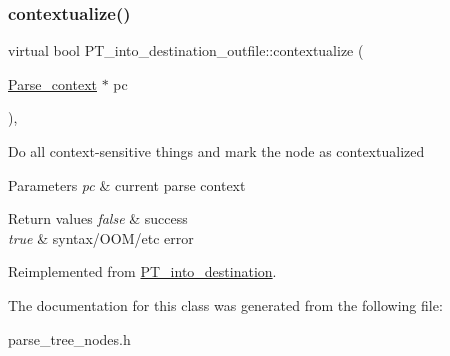 \subsubsection{\texorpdfstring{contextualize()}{contextualize()}}
{\footnotesize\ttfamily virtual bool P\+T\+\_\+into\+\_\+destination\+\_\+outfile\+::contextualize (\begin{DoxyParamCaption}\item[{\mbox{\hyperlink{structParse__context}{Parse\+\_\+context}} $\ast$}]{pc }\end{DoxyParamCaption})\hspace{0.3cm}{\ttfamily [inline]}, {\ttfamily [virtual]}}

Do all context-\/sensitive things and mark the node as contextualized


\begin{DoxyParams}{Parameters}
{\em pc} & current parse context\\
\hline
\end{DoxyParams}

\begin{DoxyRetVals}{Return values}
{\em false} & success \\
\hline
{\em true} & syntax/\+O\+O\+M/etc error \\
\hline
\end{DoxyRetVals}


Reimplemented from \mbox{\hyperlink{classPT__into__destination_aa713703e7bae0b070f8a05bcfc0a71a3}{P\+T\+\_\+into\+\_\+destination}}.



The documentation for this class was generated from the following file\+:\begin{DoxyCompactItemize}
\item 
parse\+\_\+tree\+\_\+nodes.\+h\end{DoxyCompactItemize}
